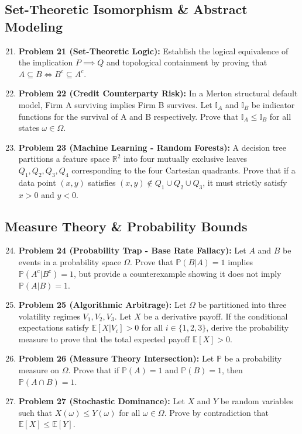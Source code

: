 \documentclass[11pt]{article}
\begin{document}
\subsection{Set-Theoretic Isomorphism \& Abstract Modeling}
\begin{enumerate}
    \setcounter{enumi}{20}
    \item \textbf{Problem 21 (Set-Theoretic Logic):} Establish the logical equivalence of the implication $P \implies Q$ and topological containment by proving that $A \subseteq B \iff B^c \subseteq A^c$.
    \item \textbf{Problem 22 (Credit Counterparty Risk):} In a Merton structural default model, Firm A surviving implies Firm B survives. Let $\mathbb{I}_A$ and $\mathbb{I}_B$ be indicator functions for the survival of A and B respectively. Prove that $\mathbb{I}_A \le \mathbb{I}_B$ for all states $\omega \in \Omega$.
    \item \textbf{Problem 23 (Machine Learning - Random Forests):} A decision tree partitions a feature space $\mathbb{R}^2$ into four mutually exclusive leaves $Q_1, Q_2, Q_3, Q_4$ corresponding to the four Cartesian quadrants. Prove that if a data point $(x,y)$ satisfies $(x,y) \notin Q_1 \cup Q_2 \cup Q_3$, it must strictly satisfy $x > 0$ and $y < 0$.
\end{enumerate}

\subsection{Measure Theory \& Probability Bounds}
\begin{enumerate}
    \setcounter{enumi}{23}
    \item \textbf{Problem 24 (Probability Trap - Base Rate Fallacy):} Let $A$ and $B$ be events in a probability space $\Omega$. Prove that $\mathbb{P}(B|A) = 1$ implies $\mathbb{P}(A^c|B^c) = 1$, but provide a counterexample showing it does not imply $\mathbb{P}(A|B) = 1$.
    \item \textbf{Problem 25 (Algorithmic Arbitrage):} Let $\Omega$ be partitioned into three volatility regimes $V_1, V_2, V_3$. Let $X$ be a derivative payoff. If the conditional expectations satisfy $\mathbb{E}[X|V_i] > 0$ for all $i \in \{1,2,3\}$, derive the probability measure to prove that the total expected payoff $\mathbb{E}[X] > 0$.
    \item \textbf{Problem 26 (Measure Theory Intersection):} Let $\mathbb{P}$ be a probability measure on $\Omega$. Prove that if $\mathbb{P}(A) = 1$ and $\mathbb{P}(B) = 1$, then $\mathbb{P}(A \cap B) = 1$.
    \item \textbf{Problem 27 (Stochastic Dominance):} Let $X$ and $Y$ be random variables such that $X(\omega) \le Y(\omega)$ for all $\omega \in \Omega$. Prove by contradiction that $\mathbb{E}[X] \le \mathbb{E}[Y]$.
\end{enumerate}
\end{document}
